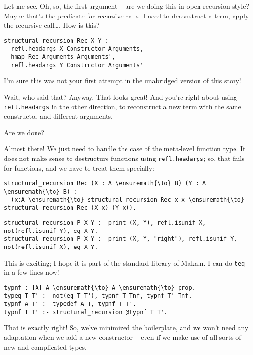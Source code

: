 \heroSTUDENT{} Let me see. Oh, so, the first argument -- are we doing this in
open-recursion style? Maybe that's the predicate for recursive calls. I
need to deconstruct a term, apply the recursive call\ldots{}. How is
this?

\begin{verbatim}
structural_recursion Rec X Y :-
  refl.headargs X Constructor Arguments,
  hmap Rec Arguments Arguments',
  refl.headargs Y Constructor Arguments'.
\end{verbatim}

\heroAUDIENCE{} I'm sure this was not your first attempt in the unabridged
version of this story!

\heroADVISOR{} Wait, who said that? Anyway. That looks great! And you're right
about using \texttt{refl.headargs} in the other direction, to
reconstruct a new term with the same constructor and different
arguments.

\heroSTUDENT{} Are we done?

\heroADVISOR{} Almost there! We just need to handle the case of the meta-level
function type. It does not make sense to destructure functions using
\texttt{refl.headargs}; so, that fails for functions, and we have to
treat them specially:

\begin{verbatim}
structural_recursion Rec (X : A \ensuremath{\to} B) (Y : A \ensuremath{\to} B) :-
  (x:A \ensuremath{\to} structural_recursion Rec x x \ensuremath{\to} structural_recursion Rec (X x) (Y x)).
\end{verbatim}

\begin{verbatim}
structural_recursion P X Y :- print (X, Y), refl.isunif X, not(refl.isunif Y), eq X Y.
structural_recursion P X Y :- print (X, Y, "right"), refl.isunif Y, not(refl.isunif X), eq X Y.
\end{verbatim}

\heroSTUDENT{} This is exciting; I hope it is part of the standard library of
Makam. I can do \texttt{teq} in a few lines now!

\begin{verbatim}
typnf : [A] A \ensuremath{\to} A \ensuremath{\to} prop.
typeq T T' :- not(eq T T'), typnf T Tnf, typnf T' Tnf.
typnf A T' :- typedef A T, typnf T T'.
typnf T T' :- structural_recursion @typnf T T'.
\end{verbatim}

\heroADVISOR{} That is exactly right! So, we've minimized the boilerplate, and
we won't need any adaptation when we add a new constructor -- even if we
make use of all sorts of new and complicated types.

